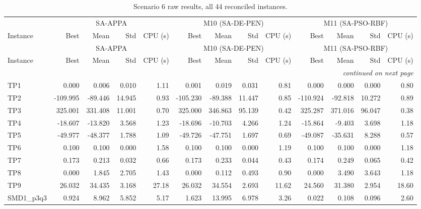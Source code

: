 \begingroup\scriptsize
\begin{longtable}{lrrrrrrrrrrrr}
\caption{Scenario 6 raw results, all 44 reconciled instances.}\label{tab:scenario6}\\
\toprule
 & \multicolumn{4}{c}{SA-APPA} & \multicolumn{4}{c}{M10 (SA-DE-PEN)} & \multicolumn{4}{c}{M11 (SA-PSO-RBF)} \\
\cmidrule(lr){2-5} \cmidrule(lr){6-9} \cmidrule(lr){10-13}
Instance & Best & Mean & Std & CPU (s) & Best & Mean & Std & CPU (s) & Best & Mean & Std & CPU (s) \\
\midrule
\endfirsthead
\toprule
 & \multicolumn{4}{c}{SA-APPA} & \multicolumn{4}{c}{M10 (SA-DE-PEN)} & \multicolumn{4}{c}{M11 (SA-PSO-RBF)} \\
\cmidrule(lr){2-5} \cmidrule(lr){6-9} \cmidrule(lr){10-13}
Instance & Best & Mean & Std & CPU (s) & Best & Mean & Std & CPU (s) & Best & Mean & Std & CPU (s) \\
\midrule
\endhead
\midrule\multicolumn{13}{r}{\emph{continued on next page}}\\\midrule
\endfoot
\bottomrule
\endlastfoot
TP1 & 0.000 & 0.006 & 0.010 & 1.11 & 0.001 & 0.019 & 0.031 & 0.81 & 0.000 & 0.000 & 0.000 & 0.80 \\
TP2 & -109.995 & -89.446 & 14.945 & 0.93 & -105.230 & -89.388 & 11.447 & 0.85 & -110.924 & -92.818 & 10.272 & 0.89 \\
TP3 & 325.001 & 331.408 & 11.001 & 0.70 & 325.000 & 346.863 & 95.139 & 0.42 & 325.287 & 371.016 & 96.047 & 0.38 \\
TP4 & -18.607 & -13.820 & 3.568 & 1.23 & -18.696 & -10.703 & 4.266 & 1.24 & -15.864 & -9.403 & 3.698 & 1.18 \\
TP5 & -49.977 & -48.377 & 1.788 & 1.09 & -49.726 & -47.751 & 1.697 & 0.69 & -49.087 & -35.631 & 8.288 & 0.57 \\
TP6 & 0.100 & 0.100 & 0.000 & 1.58 & 0.100 & 0.100 & 0.000 & 1.19 & 0.100 & 0.100 & 0.000 & 1.18 \\
TP7 & 0.173 & 0.213 & 0.032 & 0.66 & 0.173 & 0.233 & 0.044 & 0.43 & 0.174 & 0.249 & 0.065 & 0.42 \\
TP8 & 0.000 & 1.845 & 2.705 & 1.43 & 0.000 & 0.112 & 0.493 & 0.90 & 0.000 & 3.490 & 3.643 & 1.18 \\
TP9 & 26.032 & 34.435 & 3.168 & 27.18 & 26.032 & 34.554 & 2.693 & 11.62 & 24.560 & 31.380 & 2.954 & 18.60 \\
SMD1\_p3q3 & 0.924 & 8.962 & 5.852 & 5.17 & 1.623 & 13.995 & 6.978 & 3.26 & 0.022 & 0.108 & 0.096 & 2.60 \\

\end{longtable}
